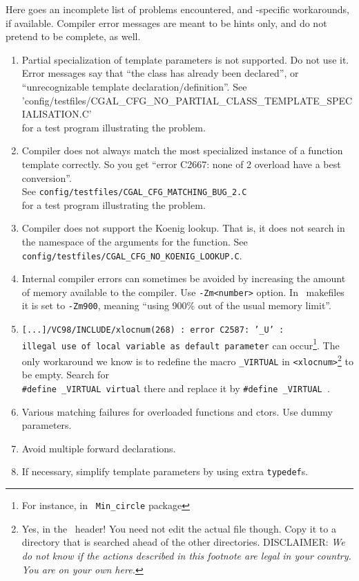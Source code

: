 Here goes an incomplete list of problems encountered, and
\cgal-specific workarounds, if available.  Compiler error messages are
meant to be hints only, and do not pretend to be complete, as well.
\begin{enumerate}
%
\item Partial specialization of template parameters is not
supported. Do not use it. Error messages say that ``the class has
already been declared'', or ``unrecognizable template
declaration/definition''. See
\nonlinkedpath'config/testfiles/CGAL_CFG_NO_PARTIAL_CLASS_TEMPLATE_SPECIALISATION.C'\\
 for a test program illustrating the problem. \label{msvc::parspec}
%
\item Compiler does not always match the most
specialized instance of a function template correctly. So you get
``error C2667: none of 2 overload have a best conversion''.\\
See \texttt{config/testfiles/CGAL\_CFG\_MATCHING\_BUG\_2.C} \\
for a test program illustrating the problem.\label{msvc::matchbug2}
%
\item Compiler does not support the Koenig
lookup. That is, it does not search in the namespace of the arguments for
the function. See
\texttt{config/testfiles/CGAL\_CFG\_NO\_KOENIG\_LOOKUP.C}. \label{msvc::koenig}
%
\item Internal compiler errors can sometimes be avoided by increasing
  the amount of memory available to the compiler. Use \texttt{-Zm<number>}
option. In \cgal\ makefiles it is set to \texttt{-Zm900}, meaning
``using 900\% out of the usual memory limit''. \label{msvc::Zm}
%
\item \texttt{[...]/VC98/INCLUDE/xlocnum(268) :
    error C2587: '\_U' :\\
    illegal use of local variable as default parameter} can
  occur\footnote{For instance, in \cgal\ \texttt{Min\_circle}
    package}. The only workaround we know is to redefine the macro
  \texttt{\_VIRTUAL} in \texttt{<xlocnum>}\footnote{Yes, in the \msvc\ 
    header! You need not edit the actual file though. Copy it to
    a directory that is searched ahead of the other directories.
    DISCLAIMER:
    {\em We do not know if the actions described in this footnote are
      legal in your country. You are on your own here.}}
  to be empty. Search for\\
  \texttt{\#define~\_VIRTUAL~virtual} there and replace it by
  \texttt{\#define~\_VIRTUAL~}. \label{msvc::VIRTUAL}
%
\item Various matching failures for overloaded functions and ctors.
Use dummy parameters.
%
\item Avoid multiple forward declarations.
%
\item If necessary, simplify template parameters by using extra 
\texttt{typedef}s.
\end{enumerate}

